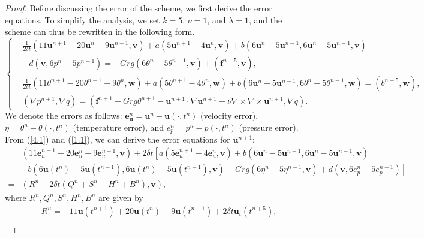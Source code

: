 \documentclass[10pt]{article}
\begin{document}
	\begin{proof}
		Before discussing the error of the scheme, we first derive the error equations. To simplify the analysis, we set \( k = 5 \), \( \nu = 1 \), and \( \lambda = 1 \), and the scheme can thus be rewritten in the following form.
		\begin{equation}\label{4.1}
			\left\{
			\begin{aligned}
				&\frac{1}{2\delta t}\left( 11\bm{u}^{n+1} - 20\bm{u}^{n} + 9\bm{u}^{n-1}, \bm{v} \right) + a\left(5\bm{u}^{n+1} - 4\bm{u}^n, \bm{v}\right) + b\left(6\bm{u}^n - 5\bm{u}^{n-1},{  6\bm{u}^n - 5\bm{u}^{n-1}}, \bm{v}\right)\\
				& - d\left(\bm{v}, 6p^n - 5p^{n-1}\right)= -Gr g \left( 6\theta^n - 5\theta^{n-1}, \bm{v} \right) + \left( \bm{f}^{n+5}, \bm{v} \right), \\
				&\frac{1}{2\delta t}\left( 11\theta^{n+1} - 20\theta^{n-1} + 9\theta^n, \bm{w} \right) +  a\left(5\theta^{n+1} - 4\theta^n, \bm{w}\right)+ b\left(6\bm{u}^n - 5\bm{u}^{n-1}, { 6\theta^{n} - 5\theta^{n-1}}, \bm{w}\right)=\left(b^{n+5}, \bm{w} \right), \\
				&\left(\nabla p^{n+1}, \nabla q\right) = \left( \bm{f}^{n+1} - Gr g  \theta^{n+1} - \bm{u}^{n+1} \cdot \nabla \bm{u}^{n+1} - \nu \nabla \times \nabla \times \bm{u}^{n+1}, \nabla q \right).
			\end{aligned}
			\right.
		\end{equation}
		We denote the errors as follows: \( \bm{e}_{\bm{u}}^n = \bm{u}^n - \bm{u}(\cdot, t^n) \) (velocity error), \( \eta = \theta^n - \theta(\cdot, t^n) \) (temperature error), and \( e_p^n = p^n - p(\cdot, t^n) \) (pressure error).  
		From (\ref{4.1}) and (\ref{1.1}), we can derive the error equations for \( \bm{u}^{n+1} \):   
		\begin{align}\label{4.2}
			&(11\bm{e}_u^{n+1} - 20\bm{e}_u^{n} + 9\bm{e}_u^{n-1}, \bm{v}) 
			+ 2\delta t\left[ a(5\bm{e}_u^{n+1} - 4\bm{e}_u^{n}, \bm{v}) + b(6\bm{u}^{n} - 5\bm{u}^{n-1}, { 6\bm{u}^{n} - 5\bm{u}^{n-1}}, \bm{v}) \right. \nonumber \\
			&  - b(6\bm{u}(t^{n}) - 5\bm{u}(t^{n-1}), { 6\bm{u}(t^{n})-5\bm{u}(t^{n-1})},\bm{v})+ Grg(6\eta^n - 5\eta^{n-1}, \bm{v}) + d(\bm{v}, 6e_p^n - 5e_p^{n-1})\left. \right] \nonumber \\
			= &( R^n + 2\delta t(Q^n + S^n + H^n + B^n),\bm{v}),
		\end{align}
		where $R^n,Q^n,S^n,H^n,B^n$ are given by
		\begin{align}
			&R^n=-11\bm{u}(t^{n+1})+20\bm{u}(t^{n})-9\bm{u}(t^{n-1})+2\delta t\bm{u}_t(t^{n+5}),\\

\end{align}
\end{proof}
\end{document}
